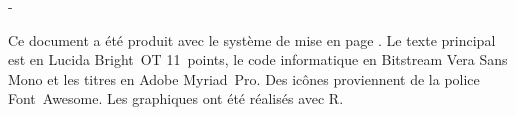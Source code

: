 \thispagestyle{empty}
\vspace*{\fill}

\begingroup
\calccentering{\unitlength}
\begin{adjustwidth*}{\unitlength}{-\unitlength}
  \begin{flushleft}
    \small %
    Ce document a été produit avec le système de mise en page {\XeLaTeX}.
    Le texte principal est en Lucida Bright~OT 11~points, le code
    informatique en Bitstream Vera Sans Mono et les titres en Adobe
    Myriad~Pro. Des icônes proviennent de la police Font~Awesome. Les
    graphiques ont été réalisés avec R.
  \end{flushleft}
\end{adjustwidth*}
\endgroup
\vfill
